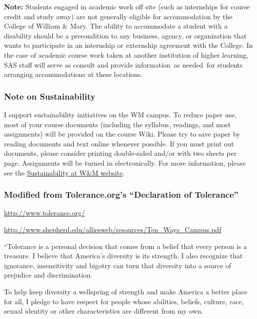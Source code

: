 \documentclass[]{article}
\begin{document}
\textbf{Note:} Students engaged in academic work off site (such as
internships for course credit and study away) are not generally eligible
for accommodation by the College of William \& Mary. The ability to
accommodate a student with a disability should be a precondition to any
business, agency, or organization that wants to participate in an
internship or externship agreement with the College. In the case of
academic course work taken at another institution of higher learning,
SAS staff will serve as consult and provide information~as needed~for
students arranging accommodations at these locations.

\subsubsection{Note on Sustainability}\label{note-on-sustainability}

I support sustainability initiatives on the WM campus. To reduce paper
use, most of your course documents (including the syllabus, readings,
and most assignments) will be provided on the course Wiki. Please try to
save paper by reading documents and text online whenever possible. If
you must print out documents, please consider printing double-sided
and/or with two sheets per page. Assignments will be turned in
electronically. For more information, please see the
\href{http://www.wm.edu/sustainability}{Sustainability at W\&M website}.

\subsubsection{\texorpdfstring{Modified from Tolerance.org's
``Declaration of
Tolerance''}{Modified from Tolerance.org's Declaration of Tolerance}}\label{modified-from-tolerance.orgs-declaration-of-tolerance}

\url{http://www.tolerance.org/}

\url{http://www.shepherd.edu/alliesweb/resources/Ten_Ways_Campus.pdf}

``Tolerance is a personal decision that comes from a belief that every
person is a treasure. I believe that America's diversity is its
strength. I also recognize that ignorance, insensitivity and bigotry can
turn that diversity into a source of prejudice and discrimination.

To help keep diversity a wellspring of strength and make America a
better place for all, I pledge to have respect for people whose
abilities, beliefs, culture, race, sexual identity or other
characteristics are different from my own.
\end{document}
